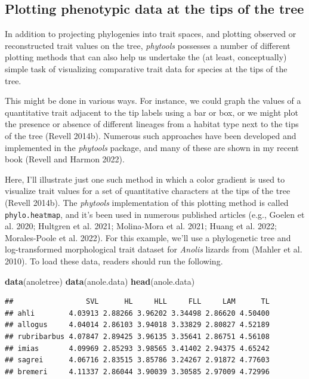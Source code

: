 \documentclass[fleqn,10pt,lineno]{wlpeerj} %
\newenvironment{Shaded}{\begin{snugshade}}{\end{snugshade}}
\newcommand{\FunctionTok}[1]{\textcolor[rgb]{0.13,0.29,0.53}{\textbf{#1}}}
\newcommand{\NormalTok}[1]{#1}
\begin{document}
\hypertarget{plotting-phenotypic-data-at-the-tips-of-the-tree}{%
\subsection{Plotting phenotypic data at the tips of the tree}\label{plotting-phenotypic-data-at-the-tips-of-the-tree}}

In addition to projecting phylogenies into trait spaces, and plotting observed or reconstructed trait values on the tree, \emph{phytools} possesses a number of different plotting methods that can also help us undertake the (at least, conceptually) simple task of visualizing comparative trait data for species at the tips of the tree.

This might be done in various ways. For instance, we could graph the values of a quantitative trait adjacent to the tip labels using a bar or box, or we might plot the presence or absence of different lineages from a habitat type next to the tips of the tree (Revell 2014b). Numerous such approaches have been developed and implemented in the \emph{phytools} package, and many of these are shown in my recent book (Revell and Harmon 2022).

Here, I'll illustrate just one such method in which a color gradient is used to visualize trait values for a set of quantitative characters at the tips of the tree (Revell 2014b). The \emph{phytools} implementation of this plotting method is called \texttt{phylo.heatmap}, and it's been used in numerous published articles (e.g., Goelen et al. 2020; Hultgren et al. 2021; Molina-Mora et al. 2021; Huang et al. 2022; Morales-Poole et al. 2022). For this example, we'll use a phylogenetic tree and log-transformed morphological trait dataset for \emph{Anolis} lizards from (Mahler et al. 2010). To load these data, readers should run the following.

\begin{Shaded}
\begin{Highlighting}[]
\FunctionTok{data}\NormalTok{(anoletree)}
\FunctionTok{data}\NormalTok{(anole.data)}
\FunctionTok{head}\NormalTok{(anole.data)}
\end{Highlighting}
\end{Shaded}

\begin{verbatim}
##                 SVL      HL     HLL     FLL     LAM      TL
## ahli        4.03913 2.88266 3.96202 3.34498 2.86620 4.50400
## allogus     4.04014 2.86103 3.94018 3.33829 2.80827 4.52189
## rubribarbus 4.07847 2.89425 3.96135 3.35641 2.86751 4.56108
## imias       4.09969 2.85293 3.98565 3.41402 2.94375 4.65242
## sagrei      4.06716 2.83515 3.85786 3.24267 2.91872 4.77603
## bremeri     4.11337 2.86044 3.90039 3.30585 2.97009 4.72996
\end{verbatim}
\end{document}
